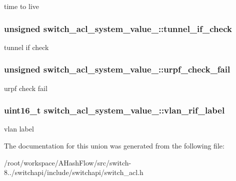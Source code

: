 time to live \hypertarget{unionswitch__acl__system__value___a034e5bc61ec4fb302706b383cfc5804c}{
\subsubsection[{tunnel\+\_\+if\+\_\+check}]{\setlength{\rightskip}{0pt plus 5cm}unsigned switch\+\_\+acl\+\_\+system\+\_\+value\+\_\+\+::tunnel\+\_\+if\+\_\+check}}\label{unionswitch__acl__system__value___a034e5bc61ec4fb302706b383cfc5804c}
tunnel if check \hypertarget{unionswitch__acl__system__value___a469b9b32cdc59ea35cd0247d57aa63ac}{
\subsubsection[{urpf\+\_\+check\+\_\+fail}]{\setlength{\rightskip}{0pt plus 5cm}unsigned switch\+\_\+acl\+\_\+system\+\_\+value\+\_\+\+::urpf\+\_\+check\+\_\+fail}}\label{unionswitch__acl__system__value___a469b9b32cdc59ea35cd0247d57aa63ac}
urpf check fail \hypertarget{unionswitch__acl__system__value___aa416a9dd92007e86b114179391f01548}{
\subsubsection[{vlan\+\_\+rif\+\_\+label}]{\setlength{\rightskip}{0pt plus 5cm}uint16\+\_\+t switch\+\_\+acl\+\_\+system\+\_\+value\+\_\+\+::vlan\+\_\+rif\+\_\+label}}\label{unionswitch__acl__system__value___aa416a9dd92007e86b114179391f01548}
vlan label 

The documentation for this union was generated from the following file\+:\begin{DoxyCompactItemize}
\item 
/root/workspace/\+A\+Hash\+Flow/src/switch-\/8../switchapi/include/switchapi/switch\+\_\+acl.\+h\end{DoxyCompactItemize}

